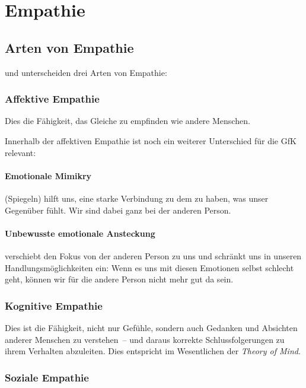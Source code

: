 \section{Empathie}
\label{empathie}

\subsection{Arten von Empathie}

\cite{shaw-empathie} und \cite[S.~100~f]{gfk-dummies} unterscheiden drei Arten von Empathie:

\subsubsection{Affektive Empathie}

Dies die Fähigkeit, das Gleiche zu empfinden wie andere Menschen.

Innerhalb der affektiven Empathie ist noch ein weiterer Unterschied für die GfK relevant:

\paragraph{Emotionale Mimikry} (Spiegeln) hilft uns, eine starke Verbindung zu dem zu haben, was unser Gegenüber fühlt. Wir sind dabei ganz bei der anderen Person.

\paragraph{Unbewusste emotionale Ansteckung} verschiebt den Fokus von der anderen Person zu uns und schränkt uns in unseren Handlungsmöglichkeiten ein: Wenn es uns mit diesen Emotionen selbst schlecht geht, können wir für die andere Person nicht mehr gut da sein.

\subsubsection{Kognitive Empathie}

Dies ist die Fähigkeit, nicht nur Gefühle, sondern auch Gedanken und Absichten anderer Menschen zu verstehen~-- und daraus korrekte Schlussfolgerungen zu ihrem Verhalten abzuleiten. Dies entspricht im Wesentlichen der \emph{Theory of Mind}.\cite{theory-of-mind-schrepfer}

\subsubsection{Soziale Empathie}

